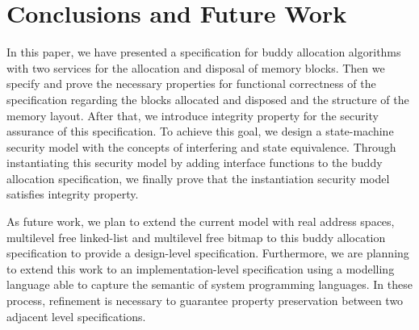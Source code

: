 \section{Conclusions and Future Work}
In this paper, we have presented a specification for buddy allocation algorithms with two services for the allocation and disposal of memory blocks. Then we specify and prove the necessary properties for functional correctness of the specification regarding the blocks allocated and disposed and the structure of the memory layout. After that, we introduce integrity property for the security assurance of this specification. To achieve this goal, we design a state-machine security model with the concepts of interfering and state equivalence. Through instantiating this security model by adding interface functions to the buddy allocation specification, we finally prove that the instantiation security model satisfies integrity property.

As future work, we plan to extend the current model with real address spaces, multilevel free linked-list and multilevel free bitmap to this buddy allocation specification to provide a design-level specification. Furthermore, we are planning to extend this work to an implementation-level specification using a modelling language able to capture the semantic of system programming languages. In these process, refinement is necessary to guarantee property preservation between two adjacent level specifications.
